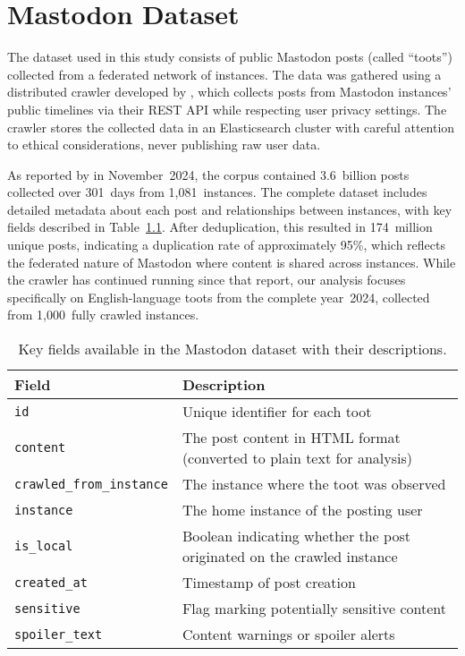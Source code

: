 \chapter{Mastodon Dataset} \label{mastodon-dataset}
The dataset used in this study consists of public Mastodon posts (called ``toots'') collected from a federated network of instances. The data was gathered using a distributed crawler developed by \citet{ernst:2024}, which collects posts from Mastodon instances' public timelines via their REST API while respecting user privacy settings. The crawler stores the collected data in an Elasticsearch cluster with careful attention to ethical considerations, never publishing raw user data.

As reported by \citet{ernst:2024} in November~2024, the corpus contained 3.6~billion posts collected over 301~days from 1,081~instances. The complete dataset includes detailed metadata about each post and relationships between instances, with key fields described in Table~\ref{dataset-fields}. After deduplication, this resulted in 174~million unique posts, indicating a duplication rate of approximately 95\%\@, which reflects the federated nature of Mastodon where content is shared across instances. While the crawler has continued running since that report, our analysis focuses specifically on English-language toots from the complete year~2024, collected from 1,000~fully crawled instances.

\begin{table}[tb]
    \centering\small
    \renewcommand{\arraystretch}{1.3}
    \begin{tabularx}{\textwidth}{lX}
        \toprule
        \textbf{Field} & \textbf{Description} \\
        \midrule
        \texttt{id} & Unique identifier for each toot \\
        \texttt{content} & The post content in HTML format (converted to plain text for analysis) \\
        \texttt{crawled\_from\_instance} & The instance where the toot was observed \\
        \texttt{instance} & The home instance of the posting user \\
        \texttt{is\_local} & Boolean indicating whether the post originated on the crawled instance \\
        \texttt{created\_at} & Timestamp of post creation \\
        \texttt{sensitive} & Flag marking potentially sensitive content \\
        \texttt{spoiler\_text} & Content warnings or spoiler alerts \\
        \bottomrule
    \end{tabularx}
    \caption{Key fields available in the Mastodon dataset with their descriptions.}
    \label{dataset-fields}
\end{table}

